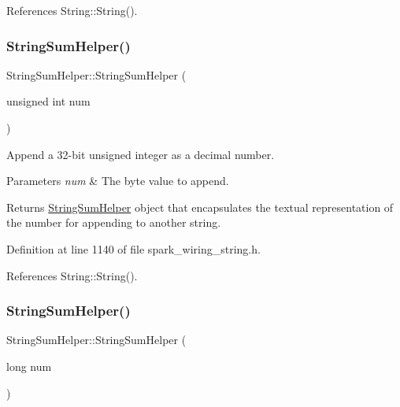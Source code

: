 References String\+::\+String().

\mbox{\label{class_string_sum_helper_a13f4d006d1f67d0d2556152f4d16e4e9}} 
\subsubsection{\texorpdfstring{String\+Sum\+Helper()}{StringSumHelper()}\hspace{0.1cm}{\footnotesize\ttfamily [6/8]}}
{\footnotesize\ttfamily String\+Sum\+Helper\+::\+String\+Sum\+Helper (\begin{DoxyParamCaption}\item[{unsigned int}]{num }\end{DoxyParamCaption})\hspace{0.3cm}{\ttfamily [inline]}}



Append a 32-\/bit unsigned integer as a decimal number. 


\begin{DoxyParams}{Parameters}
{\em num} & The byte value to append.\\
\hline
\end{DoxyParams}
\begin{DoxyReturn}{Returns}
\hyperlink{class_string_sum_helper}{String\+Sum\+Helper} object that encapsulates the textual representation of the number for appending to another string. 
\end{DoxyReturn}


Definition at line 1140 of file spark\+\_\+wiring\+\_\+string.\+h.



References String\+::\+String().

\mbox{\label{class_string_sum_helper_a6fefb0b3145abdc5632134a41770eaf7}} 
\subsubsection{\texorpdfstring{String\+Sum\+Helper()}{StringSumHelper()}\hspace{0.1cm}{\footnotesize\ttfamily [7/8]}}
{\footnotesize\ttfamily String\+Sum\+Helper\+::\+String\+Sum\+Helper (\begin{DoxyParamCaption}\item[{long}]{num }\end{DoxyParamCaption})\hspace{0.3cm}{\ttfamily [inline]}}



